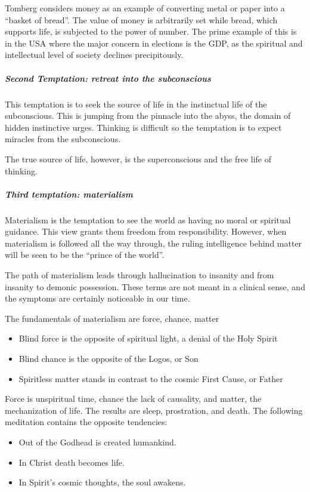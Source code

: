 Tomberg considers money as an example of converting metal or paper into a “basket of bread”. The value of money is arbitrarily set while bread, which supports life, is subjected to the power of number. The prime example of this is in the USA where the major concern in elections is the GDP, as the spiritual and intellectual level of society declines precipitously.

\subparagraph{Second Temptation: retreat into the subconscious}
This temptation is to seek the source of life in the instinctual life of the subconscious. This is jumping from the pinnacle into the abyss, the domain of hidden instinctive urges. Thinking is difficult so the temptation is to expect miracles from the subconscious.

The true source of life, however, is the superconscious and the free life of thinking.

\subparagraph{Third temptation: materialism}
Materialism is the temptation to see the world as having no moral or spiritual guidance. This view grants them freedom from responsibility. However, when materialism is followed all the way through, the ruling intelligence behind matter will be seen to be the “prince of the world”.

The path of materialism leads through hallucination to insanity and from insanity to demonic possession. These terms are not meant in a clinical sense, and the symptoms are certainly noticeable in our time.

The fundamentals of materialism are force, chance, matter

\begin{itemize}
\item Blind force is the opposite of spiritual light, a denial of the Holy Spirit 
\item Blind chance is the opposite of the Logos, or Son 
\item Spiritless matter stands in contrast to the cosmic First Cause, or Father 
\end{itemize}
Force is unspiritual time, chance the lack of causality, and matter, the mechanization of life. The results are sleep, prostration, and death. The following meditation contains the opposite tendencies:

\begin{itemize}
\item Out of the Godhead is created humankind. 
\item In Christ death becomes life. 
\item In Spirit's cosmic thoughts, the soul awakens. 
\end{itemize}
